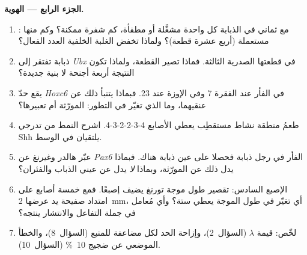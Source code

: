 \begin{problem}
\medskip
\noindent\textbf{الجزء الرابع --- الهوية.}
\begin{enumerate}[resume]
  \item {}: مع ثماني  في الذبابة كل واحدة
        مشغَّلة أو مطفأة، كم شفرة ممكنة؟ وكم منها مستعملة
        (أربع عشرة قطعة)؟ ولماذا تخفض الغلبة الخلفية العدد
        الفعال؟
  \item ذبابة تفتقر إلى \emph{Ubx} في قطعتها الصدرية الثالثة.
        فماذا تصير القطعة، ولماذا تكون النتيجة أربعة أجنحة لا
        بنية جديدة؟
  \item يقع حدّ \emph{Hoxc6} في الفأر عند الفقرة 7 وفي الإوزة
        عند 23. فبماذا يتنبأ ذلك عن عنقيهما، وما الذي تغيّر
        في التطور: المورّثة أم تعبيرها؟
  \item طعمُ منطقة نشاط مستقطِب يعطي الأصابع 4-3-2-2-3-4.
        اشرح النمط من تدرجي Shh يلتقيان في الوسط.
  \item عبّر هالدر وغيرنغ عن \emph{Pax6} الفأر في رجل ذبابة
        فحصلا على عين ذبابة هناك. فبماذا يدل ذلك عن المورّثة،
        وبماذا \emph{لا} يدل عن عيني الذباب والفئران؟
  \item الإصبع السادس: تقصير طول موجة تورنغ يضيف إصبعًا. فمع
        خمسة أصابع على امتداد صفيحة يد عرضها \qty{2}{mm}، أي
        تغيّر في طول الموجة يعطي ستة؟ وأي مُعامل في جملة
        التفاعل والانتشار ينتجه؟
  \item لخّص: قيمة $\lambda$ (السؤال~2)، وإزاحة الحد لكل
        مضاعفة للمنبع (السؤال~8)، والخطأ الموضعي عن ضجيج
        \qty{10}{\%} (السؤال~10).
\end{enumerate}
\end{problem}
